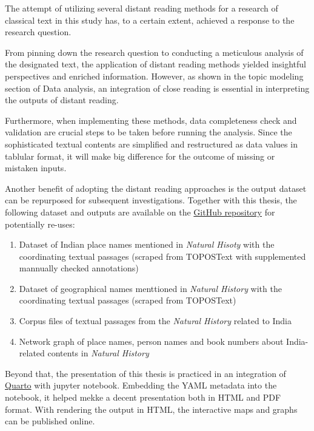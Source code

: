 \documentclass[
  12pt,
]{article}
\providecommand{\tightlist}{%
  \setlength{\itemsep}{0pt}\setlength{\parskip}{0pt}}\usepackage{longtable,booktabs,array}
\begin{document}
The attempt of utilizing several distant reading methods for a research
of classical text in this study has, to a certain extent, achieved a
response to the research question.

From pinning down the research question to conducting a meticulous
analysis of the designated text, the application of distant reading
methods yielded insightful perspectives and enriched information.
However, as shown in the topic modeling section of Data analysis, an
integration of close reading is essential in interpreting the outputs of
distant reading.

Furthermore, when implementing these methods, data completeness check
and validation are crucial steps to be taken before running the
analysis. Since the sophisticated textual contents are simplified and
restructured as data values in tablular format, it will make big
difference for the outcome of missing or mistaken inputs.

Another benefit of adopting the distant reading approaches is the output
dataset can be repurposed for subsequent investigations. Together with
this thesis, the following dataset and outputs are available on the
\href{https://github.com/lizaodawn/NH_thesis}{GitHub repository} for
potentially re-uses:

\begin{enumerate}
\def\labelenumi{\arabic{enumi}.}
\tightlist
\item
  Dataset of Indian place names mentioned in \emph{Natural Hisoty} with
  the coordinating textual passages (scraped from TOPOSText with
  supplemented mannually checked annotations)
\item
  Dataset of geographical names menttioned in \emph{Natural History}
  with the coordinating textual passages (scraped from TOPOSText)
\item
  Corpus files of textual passages from the \emph{Natural History}
  related to India
\item
  Network graph of place names, person names and book numbers about
  India-related contents in \emph{Natural History}
\end{enumerate}

Beyond that, the presentation of this thesis is practiced in an
integration of \href{https://quarto.org/}{Quarto} with jupyter notebook.
Embedding the YAML metadata into the notebook, it helped mekke a decent
presentation both in HTML and PDF format. With rendering the output in
HTML, the interactive maps and graphs can be published online.
\end{document}
